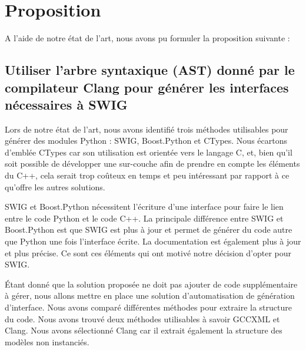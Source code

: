 \documentclass[11pt, french, screen]{report-rd-info}
\begin{document}

\chapter{Proposition}
\label{chap:Proposition}

A l'aide de notre état de l'art, nous avons pu formuler la proposition suivante :

\section{Utiliser l'arbre syntaxique (AST) donné par le compilateur Clang pour générer les interfaces nécessaires à SWIG}


Lors de notre état de l'art, nous avons identifié trois méthodes utilisables pour générer des modules Python : SWIG, Boost.Python et CTypes. Nous écartons d'emblée CTypes car son utilisation est orientée vers le langage C, et, bien qu'il soit possible de développer une sur-couche afin de prendre en compte les éléments du C++, cela serait trop coûteux en temps et peu intéressant par rapport à ce qu'offre les autres solutions.

SWIG et Boost.Python nécessitent l'écriture d'une interface pour faire le lien entre le code Python et le code C++. La principale différence entre SWIG et Boost.Python est que SWIG est plus à jour et permet de générer du code autre que Python une fois l'interface écrite. La documentation est également plus à jour et plus précise. Ce sont ces éléments qui ont motivé notre décision d'opter pour SWIG.

Étant donné que la solution proposée ne doit pas ajouter de code supplémentaire à gérer, nous allons mettre en place une solution d'automatisation de génération d'interface. Nous avons comparé différentes méthodes pour extraire la structure du code. Nous avons trouvé deux méthodes utilisables à savoir GCCXML et Clang. Nous avons sélectionné Clang car il extrait également la structure des modèles non instanciés.
\end{document}
